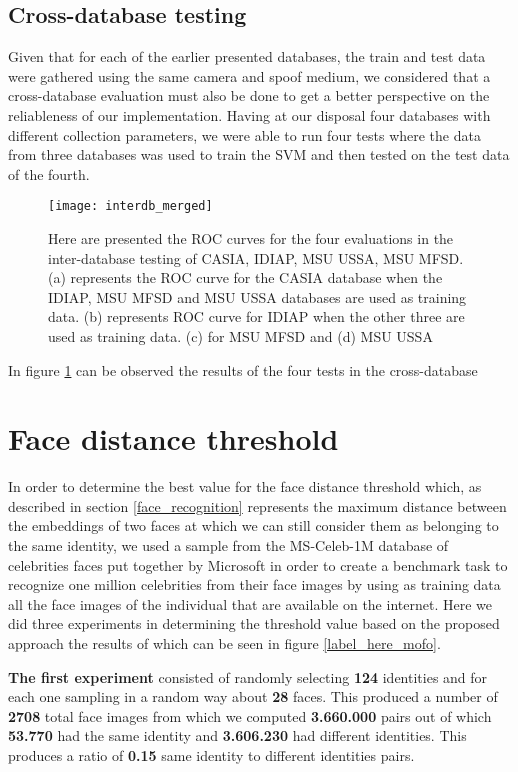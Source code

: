 \subsection{Cross-database testing}
Given that for each of the earlier presented databases, the train and test data were gathered using the same camera and spoof medium, we considered that a cross-database evaluation must also be done to get a better perspective on the reliableness of our implementation. Having at our disposal four databases with different collection parameters, we were able to run four tests where the data from three databases was used to train the SVM and then tested on the test data of the fourth. 
\begin{figure}[H]
	\captionsetup{width=15cm,font=small}
	\begin{center}
		\texttt{[image: interdb\_merged]}
	\end{center}
	\caption[Cross-database face spoof classification results]{Here are presented the ROC curves for the four evaluations in the inter-database testing of CASIA, IDIAP, MSU USSA, MSU MFSD. (a) represents the ROC curve for the CASIA database when the IDIAP, MSU MFSD and MSU USSA databases are used as training data. (b) represents ROC curve for IDIAP when the other three are used as training data. (c) for MSU MFSD and (d) MSU USSA}
	\label{fig:interdb_results}
\end{figure}
In figure \ref{fig:interdb_results} can be observed the results of the four tests in the cross-database 

\section{Face distance threshold}
In order to determine the best value for the face distance threshold which, as described in section \ref{face_recognition} represents the maximum distance between the embeddings of two faces at which we can still consider them as belonging to the same identity, we used a sample from the MS-Celeb-1M database of celebrities faces put together by Microsoft in order to create a benchmark task to recognize one million celebrities from their face images by using as training data all the face images of the individual that are available on the internet. Here we did three experiments in determining the threshold value based on the proposed approach the results of which can be seen in figure \ref{label_here_mofo}. 

\textbf{The first experiment} consisted of randomly selecting \textbf{124} identities and for each one sampling in a random way about \textbf{28} faces. This produced a number of \textbf{2708} total face images from which we computed \textbf{3.660.000} pairs out of which \textbf{53.770} had the same identity and \textbf{3.606.230} had different identities. This produces a ratio of \textbf{0.15} same identity to different identities pairs.

